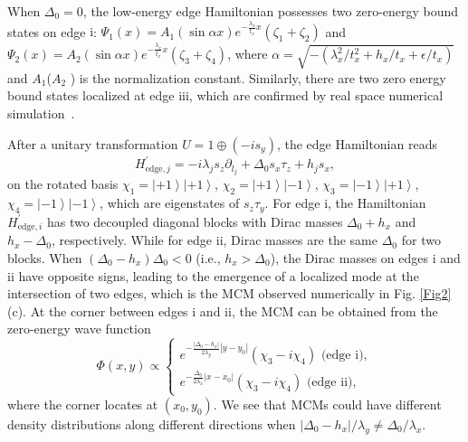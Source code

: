 \documentclass[twocolumn,prl,floatfix,citeautoscript,nofootinbib,superscriptaddress]{revtex4}
\begin{document}
When $\Delta _{0}=0$, the low-energy edge Hamiltonian possesses two
zero-energy bound states on edge $\mathrm{i}$: $\Psi _{1}\left( x\right)
=A_{1}\left( \sin \alpha x \right) e^{-\frac{\lambda _{x}}{t_{x}}x}\left(
\zeta _{1}+\zeta _{2}\right) $ and $\Psi _{2}\left( x\right) =A_{2}\left(
\sin \alpha x \right) e^{-\frac{\lambda _{x}}{t_{x}}x}\left( \zeta
_{3}+\zeta _{4}\right) $, where $\alpha =\sqrt{-\left( \lambda
_{x}^{2}/t_{x}^{2}+h_{x}/t_{x}+\epsilon /t_{x}\right) }$ and $A_{1}$($A_{2}$%
) is the normalization constant. Similarly, there are two zero energy bound
states localized at edge $\mathrm{iii}$, which are confirmed by real space
numerical simulation~\cite{SM}.

After a unitary transformation $U=1\oplus \left( -is_{y}\right) $, the edge
Hamiltonian reads%
\begin{equation}
H_{\mathrm{edge},j}^{\prime }=-i\lambda _{j}s_{z}\partial _{l_{j}}+\Delta
_{0}s_{x}\tau _{z}+h_{j}s_{x},
\end{equation}%
on the rotated basis $\chi _{1}=\left\vert +1\right\rangle \left\vert
+1\right\rangle $, $\chi _{2}=\left\vert +1\right\rangle \left\vert
-1\right\rangle $, $\chi _{3}=\left\vert -1\right\rangle \left\vert
+1\right\rangle $, $\chi _{4}=\left\vert -1\right\rangle \left\vert
-1\right\rangle $, which are eigenstates of $s_{z}\tau _{y}$. For edge $%
\mathrm{i}$, the Hamiltonian $H_{\mathrm{edge,}i}^{\prime }$ has two
decoupled diagonal blocks with Dirac masses $\Delta _{0}+h_{x}$ and $%
h_{x}-\Delta _{0}$, respectively. While for edge $\mathrm{ii}$, Dirac masses
are the same $\Delta _{0}$ for two blocks. When $(\Delta _{0}-h_{x})\Delta
_{0}<0$ (i.e., $h_{x}>\Delta _{0}$), the Dirac masses on edges $\mathrm{i}$
and $\mathrm{ii}$ have opposite signs, leading to the emergence of a
localized mode at the intersection of two edges, which is the MCM observed
numerically in Fig. \ref{Fig2}(c). At the corner between edges $\mathrm{i}$
and $\mathrm{ii}$, the MCM can be obtained from the zero-energy wave
function
\begin{equation}
\Phi \left( x,y\right) \propto \left\{
\begin{array}{c}
e^{-\frac{\left\vert \Delta _{0}-h_{x}\right\vert }{2\lambda _{y}}\left\vert
y-y_{0}\right\vert }\left( \chi _{3}-i\chi _{4}\right) \text{ \ (edge }%
\mathrm{i}\text{)}, \\
e^{-\frac{\Delta _{0}}{2\lambda _{x}}\left\vert x-x_{0}\right\vert }\left(
\chi _{3}-i\chi _{4}\right) \text{ \ \ \ \ \ \ (edge }\mathrm{ii}\text{)},%
\end{array}%
\right.
\end{equation}%
where the corner locates at $(x_{0},y_{0})$. We see that MCMs could have
different density distributions along different directions when $\left\vert
\Delta _{0}-h_{x}\right\vert /\lambda _{y}\neq \Delta _{0}/\lambda _{x}$.
\end{document}
